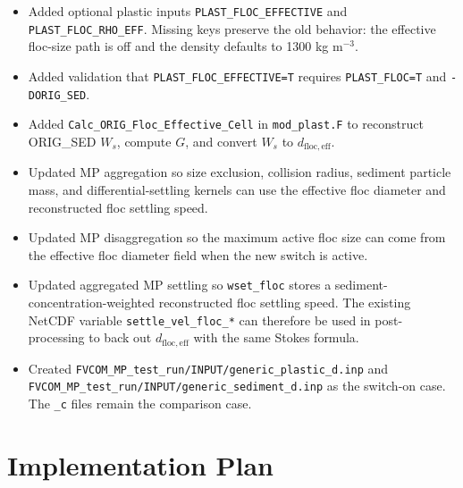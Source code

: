 \documentclass[11pt]{article}
\begin{document}
\begin{itemize}
  \item Added optional plastic inputs \texttt{PLAST\_FLOC\_EFFECTIVE} and
        \texttt{PLAST\_FLOC\_RHO\_EFF}.  Missing keys preserve the old behavior:
        the effective floc-size path is off and the density defaults to
        1300 kg m$^{-3}$.
  \item Added validation that \texttt{PLAST\_FLOC\_EFFECTIVE=T} requires
        \texttt{PLAST\_FLOC=T} and \texttt{-DORIG\_SED}.
  \item Added \texttt{Calc\_ORIG\_Floc\_Effective\_Cell} in
        \texttt{mod\_plast.F} to reconstruct ORIG\_SED $W_s$, compute $G$, and
        convert $W_s$ to $d_{\mathrm{floc,eff}}$.
  \item Updated MP aggregation so size exclusion, collision radius, sediment
        particle mass, and differential-settling kernels can use the effective
        floc diameter and reconstructed floc settling speed.
  \item Updated MP disaggregation so the maximum active floc size can come from
        the effective floc diameter field when the new switch is active.
  \item Updated aggregated MP settling so \texttt{wset\_floc} stores a
        sediment-concentration-weighted reconstructed floc settling speed.  The
        existing NetCDF variable \texttt{settle\_vel\_floc\_*} can therefore be
        used in post-processing to back out
        $d_{\mathrm{floc,eff}}$ with the same Stokes formula.
  \item Created \texttt{FVCOM\_MP\_test\_run/INPUT/generic\_plastic\_d.inp} and
        \texttt{FVCOM\_MP\_test\_run/INPUT/generic\_sediment\_d.inp} as the
        switch-on case.  The \texttt{\_c} files remain the comparison case.
\end{itemize}

\section*{Implementation Plan}
\end{document}
